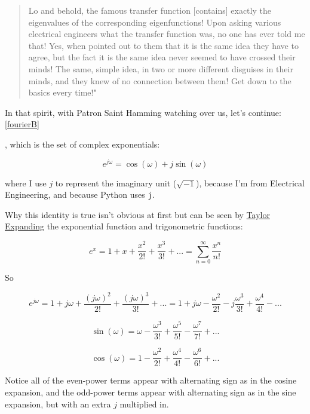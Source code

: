 \documentclass[10pt]{article}
\begin{document}
{\begin{quotation}
Lo and behold, the famous transfer function [contains] exactly the eigenvalues of the corresponding eigenfunctions! Upon asking various electrical engineers what the transfer function was, no one has ever told me that! Yes, when pointed out to them that it is the same idea they have to agree, but the fact it is the same idea never seemed to have crossed their minds! The same, simple idea, in two or more different disguises in their minds, and they knew of no connection between them! Get down to the basics every time!"\end{quotation}

In that spirit, with Patron Saint Hamming watching over us, let's continue: \autoref{fourierB}}, which is the set of complex exponentials:\vspace{-2mm}

\begin{equation}\label{euler}
e^{j \omega} = \cos(\omega) + j \sin(\omega)
\end{equation}

\noindent where I use $j$ to represent the imaginary unit ($\sqrt{-1}$), because I'm from Electrical Engineering, and because Python uses \texttt{j}.

Why this identity is true isn't obvious at first but can be seen by \href{https://math.stackexchange.com/a/492165/278341}{Taylor Expanding}\cite{taylor} the exponential function and trigonometric functions:

$$e^x = 1 + x + \frac{x^2}{2!} + \frac{x^3}{3!} + ... = \sum_{n=0}^{\infty} \frac{x^n}{n!}$$

So\vspace{-2mm}

$$e^{j \omega} = 1 + j \omega + \frac{(j \omega)^2}{2!} + \frac{(j \omega)^3}{3!} + ... = 1 + j \omega - \frac{\omega^2}{2!} - j \frac{\omega^3}{3!} + \frac{\omega^4}{4!} - ...$$

$$\sin(\omega) = \omega - \frac{\omega^3}{3!} + \frac{\omega^5}{5!} - \frac{\omega^7}{7!} + ...$$

$$\cos(\omega) = 1 - \frac{\omega^2}{2!} + \frac{\omega^4}{4!} - \frac{\omega^6}{6!} + ...$$\vspace{0mm}

Notice all of the even-power terms appear with alternating sign as in the cosine expansion, and the odd-power terms appear with alternating sign as in the sine expansion, but with an extra $j$ multiplied in.
\end{document}
